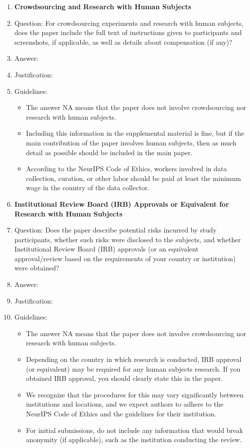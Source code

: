 \documentclass{article}
\begin{document}
\begin{enumerate}
    \item {\bf Crowdsourcing and Research with Human Subjects}
    \item[] Question: For crowdsourcing experiments and research with human subjects, does the paper include the full text of instructions given to participants and screenshots, if applicable, as well as details about compensation (if any)?
    \item[] Answer: \answerTODO{} %
    \item[] Justification: \justificationTODO{}
    \item[] Guidelines:
        \begin{itemize}
            \item The answer NA means that the paper does not involve crowdsourcing nor research with human subjects.
            \item Including this information in the supplemental material is fine, but if the main contribution of the paper involves human subjects, then as much detail as possible should be included in the main paper.
            \item According to the NeurIPS Code of Ethics, workers involved in data collection, curation, or other labor should be paid at least the minimum wage in the country of the data collector.
        \end{itemize}
    \item {\bf Institutional Review Board (IRB) Approvals or Equivalent for Research with Human Subjects}
    \item[] Question: Does the paper describe potential risks incurred by study participants, whether such risks were disclosed to the subjects, and whether Institutional Review Board (IRB) approvals (or an equivalent approval/review based on the requirements of your country or institution) were obtained?
    \item[] Answer: \answerTODO{} %
    \item[] Justification: \justificationTODO{}
    \item[] Guidelines:
        \begin{itemize}
            \item The answer NA means that the paper does not involve crowdsourcing nor research with human subjects.
            \item Depending on the country in which research is conducted, IRB approval (or equivalent) may be required for any human subjects research. If you obtained IRB approval, you should clearly state this in the paper.
            \item We recognize that the procedures for this may vary significantly between institutions and locations, and we expect authors to adhere to the NeurIPS Code of Ethics and the guidelines for their institution.
            \item For initial submissions, do not include any information that would break anonymity (if applicable), such as the institution conducting the review.
        \end{itemize}

\end{enumerate}
\end{document}
